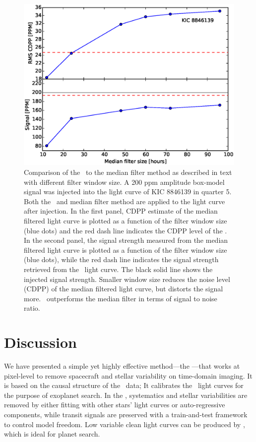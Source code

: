 \begin{figure}[p]
\begin{center}
\includegraphics[width=\textwidth]{figures/cpm/f7a}
\end{center}
\caption[Comparison between \name\ and median filter]{
  \label{filter} 
Comparison of the \name\ to the median filter method as described in text with different filter window size. A 200 ppm amplitude box-model signal was injected into the light curve of KIC 8846139 in quarter 5. Both the \name\ and median filter method are applied to the light curve after injection. In the first panel, CDPP estimate of the median filtered light curve is plotted as a function of the filter window size (blue dots) and the red dash line indicates the CDPP level of the \name. In the second panel, the signal strength measured from the median filtered light curve is plotted as a function of the filter window size (blue dots), while the red dash line indicates the signal strength retrieved from the \name\ light curve. The black solid line shows the injected signal strength. Smaller window size reduces the noise level (CDPP) of the median filtered light curve, but distorts the signal more. \name\ outperforms the median filter in terms of signal to noise ratio.
}
\end{figure}

\section{Discussion}
We have presented a simple yet highly effective method---the \name---that works at pixel-level to remove spacecraft and stellar variability on time-domain imaging. It is based on the causal structure of the \Kepler\ data; It calibrates the \Kepler\ light curves for the purpose of exoplanet search.
In the \name, systematics and stellar variabilities are removed by either fitting with other stars' light curves or auto-regressive components, while transit signals are preserved with a train-and-test framework to control model freedom.
Low variable clean light curves can be produced by \name, which is ideal for planet search. 

